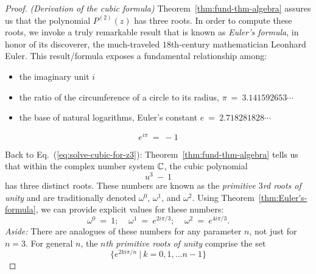 \begin{proof} {\it (Derivation of the cubic formula)}
Theorem~\ref{thm:fund-thm-algebra} assures us that the polynomial $P^{(2)}(z)$ has three roots.  In order to compute these roots, we invoke a truly remarkable result that is known as  {\it Euler's formula}, in honor of its discoverer, the much-traveled $18$th-century mathematician Leonhard Euler.  This result/formula exposes a fundamental relationship among:
\begin{itemize}
\item
the imaginary unit  $i$
\medskip\item
the ratio of the circumference of a circle to its radius, $\pi \ = \ 3.141592653 \cdots$
\medskip\item
the base of natural logarithms, Euler's constant $e \ = \ 2.718281828 \cdots$
\end{itemize}

\begin{theorem}
\label{thm:Euler's-formula}
\[ e^{i \pi} \ = \ -1 \]
\end{theorem}

\smallskip

  
Back to Eq.~(\ref{eq:solve-cubic-for-z3}): Theorem~\ref{thm:fund-thm-algebra} tells us that within the complex number system $\mathbb{C}$, the cubic polynomial
\[ u^3 \ - \ 1 \]
has three distinct roots.  These numbers are known as the {\em primitive $3$rd roots of unity}  and are traditionally denoted $\omega^0$, $\omega^1$, and $\omega^2$.  Using Theorem~\ref{thm:Euler's-formula}, we can provide explicit values for these numbers:
\[ \omega^0 \ = \ 1; \ \ \ \ \
\omega^1 \ = \ e^{2i \pi/3}; \ \ \ \ \
\omega^2 \ = \ e^{4i \pi/3}.
\]
{\em Aside:} There are analogues of these numbers for any parameter $n$, not just for $n=3$.  For general $n$, the {\it $n$th primitive roots of unity} comprise the set
\[ \{ e^{2ki \pi/n} \ | \ k = 0, 1, \ldots n-1\} \]

\medskip


\end{proof}
